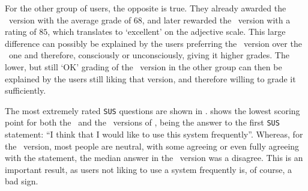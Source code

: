 For the other group of users, the opposite is true. They already awarded the \IDb\ version with the average grade of $68$, and later rewarded the \IDa\ version with a rating of $85$, which translates to `excellent' on the adjective scale. This large difference can possibly be explained by the users preferring the \IDa\ version over the \IDb\ one and therefore, consciously or unconsciously, giving it higher grades. The lower, but still `OK' grading of the \IDb\ version in the other group can then be explained by the users still liking that version, and therefore willing to grade it sufficiently.

The most extremely rated \verb|SUS| questions are shown in .  shows the lowest scoring point for both the \IDa\ and the \IDb\ versions of \oframp, being the answer to the first \verb|SUS| statement: ``I think that I would like to use this system frequently''. Whereas, for the \IDa\ version, most people are neutral, with some agreeing or even fully agreeing with the statement, the median answer in the \IDb\ version was a disagree. This is an important result, as users not liking to use a system frequently is, of course, a bad sign.

